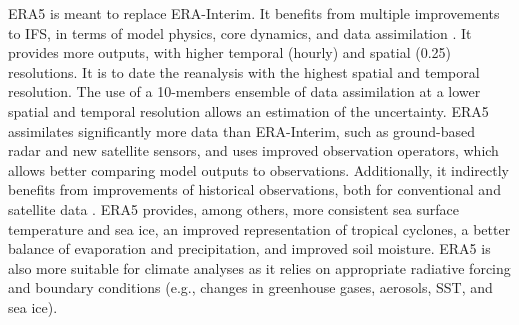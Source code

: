 \documentclass[alpha-refs]{wiley-article}
\begin{document}
ERA5 \citep{Hersbach2019} is meant to replace ERA-Interim. It benefits from multiple improvements to IFS, in terms of model physics, core dynamics, and data assimilation \citep{Hersbach2019}. It provides more outputs, with higher temporal (hourly) and spatial (0.25\degree) resolutions. It is to date the reanalysis with the highest spatial and temporal resolution. The use of a 10-members ensemble of data assimilation at a lower spatial and temporal resolution allows an estimation of the uncertainty. ERA5 assimilates significantly more data than ERA-Interim, such as ground-based radar and new satellite sensors, and uses improved observation operators, which allows better comparing model outputs to observations. Additionally, it indirectly benefits from improvements of historical observations, both for conventional and satellite data \citep{Hersbach2019}. ERA5 provides, among others, more consistent sea surface temperature and sea ice, an improved representation of tropical cyclones, a better balance of evaporation and precipitation, and improved soil moisture. ERA5 is also more suitable for climate analyses as it relies on appropriate radiative forcing and boundary conditions (e.g., changes in greenhouse gases, aerosols, SST, and sea ice).
\end{document}
